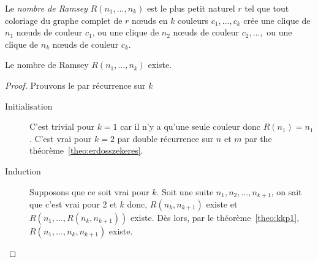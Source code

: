 \begin{mydef} 
Le \emph{nombre de Ramsey} $R(n_1 , ..., n_k)$ est le plus petit naturel $r$ tel que tout coloriage du graphe complet de $r$ nœuds en $k$ couleurs $c_1, \ldots, c_k$ crée une clique de $n_1$ nœuds de couleur $c_1$, ou une clique de $n_2$ nœuds de couleur $c_2, ...,$ ou une clique de $n_k$ nœuds de couleur $c_k$.
\end{mydef}

\begin{mytheo} 
  Le nombre de Ramsey $R(n_1,...,n_k)$ existe.
  \begin{proof}
    Prouvons le par récurrence sur $k$
    \begin{description}
      \item[Initialisation]
        C'est trivial pour $k = 1$ car il n'y a qu'une seule couleur donc $R(n_1) = n_1$.
        C'est vrai pour $k = 2$ par double récurrence sur $n$ et $m$ par the théorème~\ref{theo:erdosszekeres}.
      \item[Induction]
        Supposons que ce soit vrai pour $k$.
        Soit une suite $n_1, n_2, \ldots, n_{k+1}$, on sait que c'est vrai pour 2 et $k$ donc,
        $R(n_k, n_{k+1})$ existe et $R(n_1, \ldots, R(n_k, n_{k+1}))$ existe.
        Dès lors, par le théorème~\ref{theo:kkp1},
        $R(n_1, \ldots, n_k, n_{k+1})$ existe.
    \end{description}
  \end{proof}
\end{mytheo}

